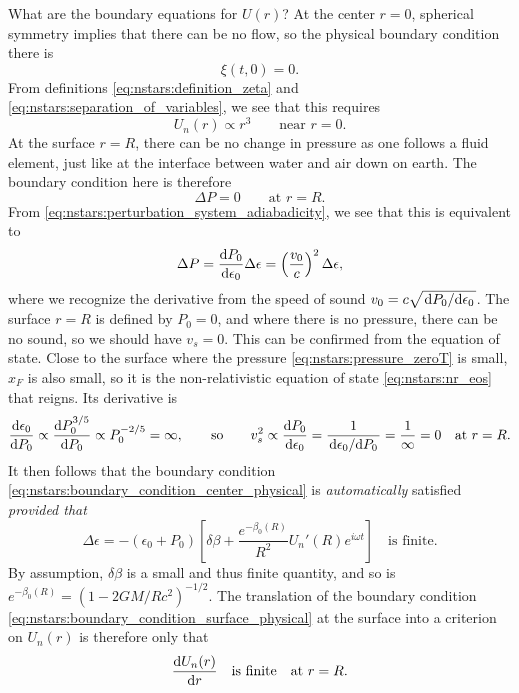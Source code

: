 What are the boundary equations for $U(r)$?
At the center $r = 0$, spherical symmetry implies that there can be no flow, so the physical boundary condition there is
\begin{equation}
	\xi(t, 0) = 0.
\label{eq:nstars:boundary_condition_center_physical}
\end{equation}
From definitions \eqref{eq:nstars:definition_zeta} and \eqref{eq:nstars:separation_of_variables}, we see that this requires
\begin{equation}
	U_n(r) \propto r^3
	\qquad \text{near } r = 0.
\label{eq:nstars:boundary_condition_center_mathematical}
\end{equation}
At the surface $r = R$, there can be no change in pressure as one follows a fluid element, just like at the interface between water and air down on earth.
The boundary condition here is therefore
\begin{equation}
	\Delta P = 0
	\qquad \text{at } r = R.
\end{equation}
From \cref{eq:nstars:perturbation_system_adiabadicity}, we see that this is equivalent to
\begin{equation}
	\Delta P = \odv{P_0}{\epsilon_0} \Delta \epsilon = \left( \frac{v_0}{c} \right)^2 \Delta\epsilon ,
\end{equation}
where we recognize the derivative from the speed of sound $v_0 = c \sqrt{\odv{P_0}/{\epsilon_0}}$.
The surface $r = R$ is defined by $P_0 = 0$, and where there is no pressure, there can be no sound, so we should have $v_s = 0$.
This can be confirmed from the equation of state.
Close to the surface where the pressure \eqref{eq:nstars:pressure_zeroT} is small, $x_F$ is also small, so it is the non-relativistic equation of state \eqref{eq:nstars:nr_eos} that reigns.
Its derivative is
\begin{equation}
	\odv{\epsilon_0}{P_0} \propto \odv{P_0^{3/5}}{P_0} \propto P_0^{-2/5} = \infty ,
	\qquad \text{so} \qquad
	v_s^2 \propto \odv{P_0}{\epsilon_0} = \frac{1}{\odv{\epsilon_0}/{P_0}} = \frac{1}{\infty} = 0
	\quad \text{at } r = R.
\label{eq:nstars:boundary_condition_surface_physical}
\end{equation}
It then follows that the boundary condition \eqref{eq:nstars:boundary_condition_center_physical} is \emph{automatically} satisfied \emph{provided that}
\begin{equation}
	\Delta \epsilon = - \left( \epsilon_0 + P_0 \right) \left[ \delta\beta + \frac{e^{-\beta_0(R)}}{R^2} U_n'(R) e^{i \omega t} \right] \quad \text{is finite}.
\end{equation}
By assumption, $\delta\beta$ is a small and thus finite quantity, and so is $e^{-\beta_0(R)} = \left( 1 - 2 G M / R c^2 \right)^{-1/2}$.
The translation of the boundary condition \eqref{eq:nstars:boundary_condition_surface_physical} at the surface into a criterion on $U_n(r)$ is therefore only that
\begin{equation}
	\odv{U_n(r)}{r} \quad \text{is finite} \quad \text{at } r = R.
\label{eq:nstars:boundary_condition_surface_mathematical}
\end{equation}

